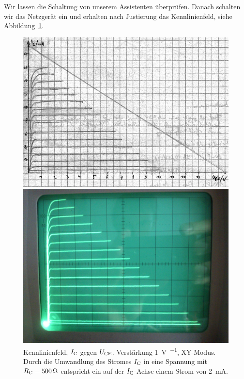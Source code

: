Wir lassen die Schaltung von unserem Assistenten überprüfen. Danach schalten
wir das Netzgerät ein und erhalten nach Justierung das Kennlinienfeld, siehe
Abbildung~\ref{fig:3}.

\begin{figure}
	\centering
	\begin{minipage}{.45\linewidth}
		\includegraphics[width=\linewidth]{Oszi_Hand/3-03.jpg}
	\end{minipage}
	\hfill
	\begin{minipage}{.45\linewidth}
		\includegraphics[width=\linewidth]{Oszi_Foto/3-03.jpg}
	\end{minipage}
	\caption{%
		Kennlinienfeld, $I_\text{C}$ gegen $U_\text{CE}$. Verstärkung
		\SI{1}{\volt\per\division}, XY-Modus. Durch die Umwandlung des Stromes
		$I_\text{C}$ in eine Spannung mit $R_\text{C} = \SI{500}\ohm$ entspricht ein
		\si{\division} auf der $I_\text{C}$-Achse einem Strom von
		\SI{2}{\milli\ampere}.
	}
	\label{fig:3}
\end{figure}

